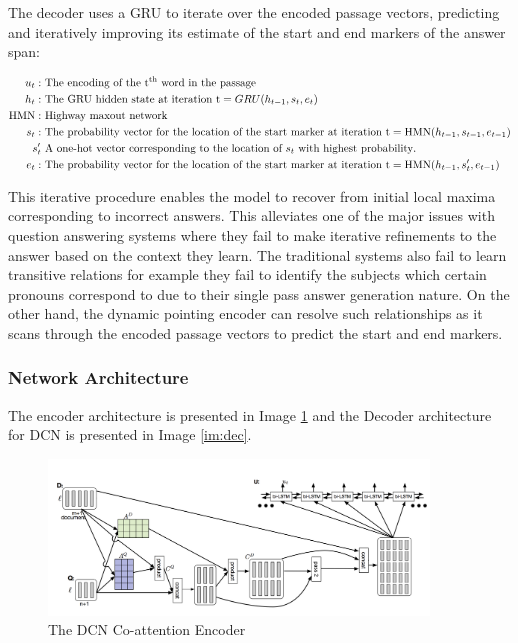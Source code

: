 The decoder uses a GRU to iterate over the encoded passage vectors, predicting and iteratively improving its estimate of the start and end markers of the answer span:

\begin{align*}
u_t: &\text{ The encoding of the t\textsuperscript{th} word in the passage} \\
h_t: &\text{ The GRU hidden state at iteration t} = GRU(h_{t - 1}, s_t, e_t) \\
\text{HMN}: &\text{ Highway maxout network} \\
s_t: &\text{ The probability vector for the location of the start marker at iteration t} = \text{HMN}(h_{t - 1}, s_{t - 1}, e_{t - 1}) \\
s_t' &\text{ A one-hot vector corresponding to the location of } s_t \text{ with highest probability}. \\
e_t: &\text{ The probability vector for the location of the start marker at iteration t} = \text{HMN}(h_{t - 1}, s_t', e_{t - 1})\\
\end{align*}

This iterative procedure enables the model to recover from initial local maxima corresponding to incorrect answers. This alleviates one of the major issues with question answering systems where they fail to make iterative refinements to the answer based on the context they learn. The traditional systems also fail to learn transitive relations for example they fail to identify the subjects which certain pronouns correspond to due to their single pass answer generation nature. On the other hand, the dynamic pointing encoder can resolve such relationships as it scans through the encoded passage vectors to predict the start and end markers.\\

\subsubsection{Network Architecture}
The encoder architecture is presented in Image \ref{im:enc} and the Decoder architecture for DCN is presented in Image \ref{im:dec}.

\begin{figure}[h]
    \centering
    \includegraphics[width=0.9\textwidth]{images/coattn_encoder.png}
    \caption{The DCN Co-attention Encoder}
    \label{im:enc}
\end{figure}

